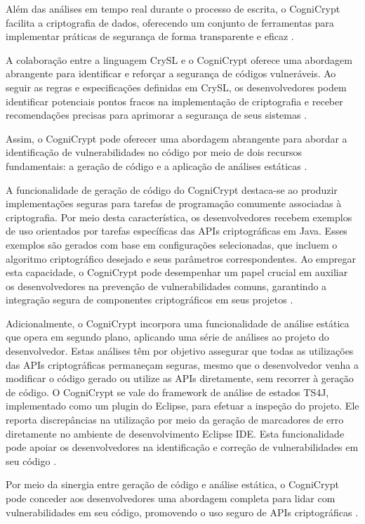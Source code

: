 Além das análises em tempo real durante o processo de escrita, o CogniCrypt facilita a criptografia de dados, oferecendo um conjunto de ferramentas para implementar práticas de segurança de forma transparente e eficaz \cite{CogniCrypt}.

A colaboração entre a linguagem CrySL e o CogniCrypt oferece uma abordagem abrangente para identificar e reforçar a segurança de códigos vulneráveis. Ao seguir as regras e especificações definidas em CrySL, os desenvolvedores podem identificar potenciais pontos fracos na implementação de criptografia e receber recomendações precisas para aprimorar a segurança de seus sistemas \cite{CogniCrypt}.

Assim, o CogniCrypt pode oferecer uma abordagem abrangente para abordar a identificação de vulnerabilidades no código por meio de dois recursos fundamentais: a geração de código e a aplicação de análises estáticas \cite{CogniCrypt}.

A funcionalidade de geração de código do CogniCrypt destaca-se ao produzir implementações seguras para tarefas de programação comumente associadas à criptografia. Por meio desta característica, os desenvolvedores recebem exemplos de uso orientados por tarefas específicas das APIs criptográficas em Java. Esses exemplos são gerados com base em configurações selecionadas, que incluem o algoritmo criptográfico desejado e seus parâmetros correspondentes. Ao empregar esta capacidade, o CogniCrypt pode desempenhar um papel crucial em auxiliar os desenvolvedores na prevenção de vulnerabilidades comuns, garantindo a integração segura de componentes criptográficos em seus projetos \cite{CogniCrypt}.

Adicionalmente, o CogniCrypt incorpora uma funcionalidade de análise estática que opera em segundo plano, aplicando uma série de análises ao projeto do desenvolvedor. Estas análises têm por objetivo assegurar que todas as utilizações das APIs criptográficas permaneçam seguras, mesmo que o desenvolvedor venha a modificar o código gerado ou utilize as APIs diretamente, sem recorrer à geração de código. O CogniCrypt se vale do framework de análise de estados TS4J, implementado como um plugin do Eclipse, para efetuar a inspeção do projeto. Ele reporta discrepâncias na utilização por meio da geração de marcadores de erro diretamente no ambiente de desenvolvimento Eclipse IDE. Esta funcionalidade pode apoiar os desenvolvedores na identificação e correção de vulnerabilidades em seu código \cite{CogniCrypt}.

Por meio da sinergia entre geração de código e análise estática, o CogniCrypt pode conceder aos desenvolvedores uma abordagem completa para lidar com vulnerabilidades em seu código, promovendo o uso seguro de APIs criptográficas \cite{CogniCrypt}.

